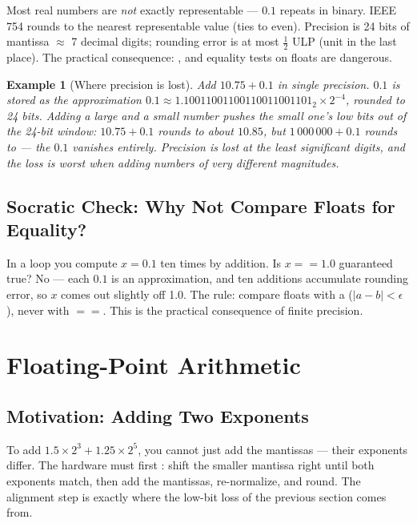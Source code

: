 \documentclass[11pt]{article}
\newtheorem{example}{Example}[section]
\begin{document}
Most real numbers are \emph{not} exactly representable --- $0.1$ repeats in binary. IEEE 754 rounds to the nearest representable value (ties to even). Precision is 24 bits of mantissa $\approx$ 7 decimal digits; rounding error is at most $\tfrac{1}{2}$ ULP (unit in the last place). The practical consequence: , and equality tests on floats are dangerous.

\begin{example}[Where precision is lost]
Add $10.75 + 0.1$ in single precision. $0.1$ is stored as the approximation $0.1 \approx 1.10011001100110011001101_2 \times 2^{-4}$, rounded to 24 bits. Adding a \emph{large} and a \emph{small} number pushes the small one's low bits out of the 24-bit window: $10.75 + 0.1$ rounds to about $10.85$, but $1\,000\,000 + 0.1$ rounds to  --- the $0.1$ vanishes entirely. Precision is lost at the \emph{least significant} digits, and the loss is worst when adding numbers of very different magnitudes.
\end{example}

\subsection{Socratic Check: Why Not Compare Floats for Equality?}

In a loop you compute $x = 0.1$ ten times by addition. Is $x == 1.0$ guaranteed true? No --- each $0.1$ is an approximation, and ten additions accumulate rounding error, so $x$ comes out slightly off 1.0. The rule: compare floats with a  ($|a-b| < \epsilon$), never with $==$. This is the practical consequence of finite precision.

\section{Floating-Point Arithmetic}
\label{sec:fp-arithmetic}

\subsection{Motivation: Adding Two Exponents}

To add $1.5 \times 2^3 + 1.25 \times 2^5$, you cannot just add the mantissas --- their exponents differ. The hardware must first : shift the smaller mantissa right until both exponents match, then add the mantissas, re-normalize, and round. The alignment step is exactly where the low-bit loss of the previous section comes from.
\end{document}
